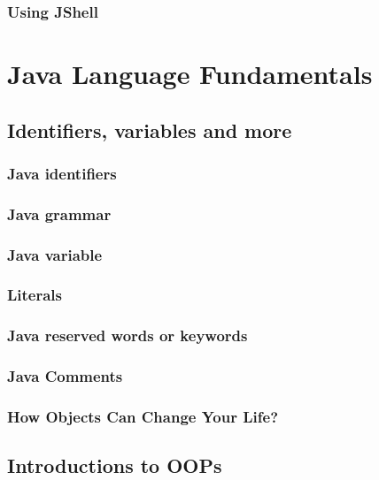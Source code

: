 \documentclass[14pt,fleqn]{extbook} %
\begin{document}
\subsection{Using JShell}




\chapter{Java Language Fundamentals}
\section{Identifiers, variables and more}

\subsection{Java identifiers}

\subsection{Java grammar}

\subsection{Java variable}

\subsection{Literals}

\subsection{Java reserved words or keywords}

\subsection{Java Comments}

\subsection{How Objects Can Change Your Life?}

\section{Introductions to OOPs}

\end{document}
